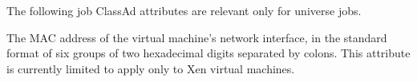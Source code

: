 The following job ClassAd attributes are relevant only for
 universe jobs.

\begin {description}

\item[\AdAttr{VM\_MACAddr}:] The MAC address of the virtual
machine's network interface,
in the standard format of six groups of
two hexadecimal digits separated by colons.
This attribute is currently limited to apply only to Xen virtual machines.






\end{description}
